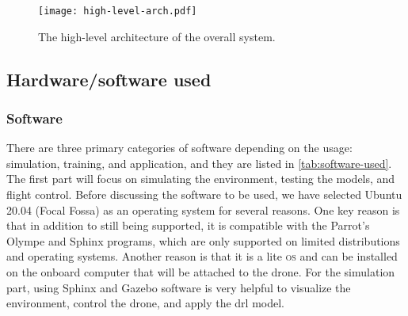 \documentclass[../main.tex]{subfiles}
\begin{document}
\begin{figure}[h]
    \centering
    \texttt{[image: high-level-arch.pdf]}
    \caption{The high-level architecture of the overall system.}
    \label{fig:arch-fig}
\end{figure}

\subsection{Hardware/software used}

\subsubsection{Software}

There are three primary categories of software 
depending on the usage: simulation, training, 
and application, and they are listed in \cref{tab:software-used}. The first part will focus on 
simulating the environment, testing the models, 
and flight control. Before discussing the software 
to be used, we have selected Ubuntu 20.04 (Focal Fossa) 
as an operating system for several reasons. 
One key reason is that in addition to
still being supported, it is compatible with the 
Parrot's Olympe and Sphinx programs, which are only 
supported on limited distributions and operating systems.
Another reason is that it is a lite \textsc{os} 
and can be installed on the onboard computer that 
will be attached to the drone. For the simulation part, 
using Sphinx and Gazebo software is very helpful
to visualize the environment, control the drone, 
and apply the \gls{drl} model. 
\end{document}
